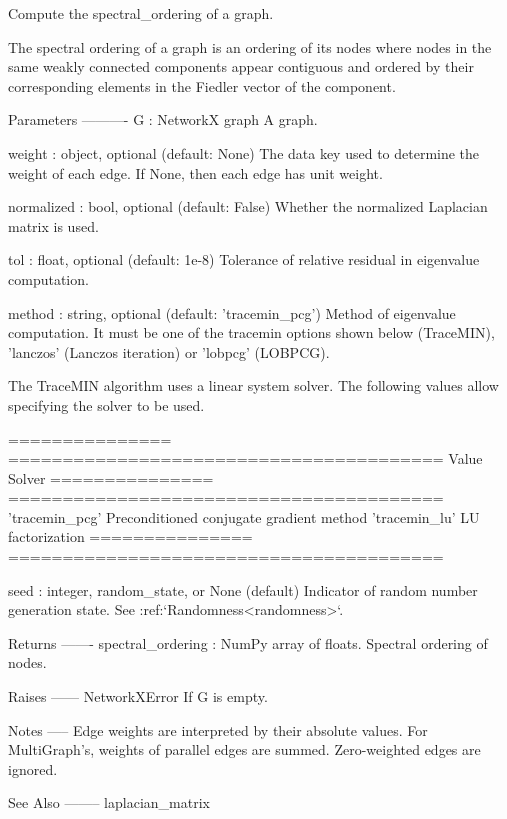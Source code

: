 \begin{DoxyVerb}Compute the spectral_ordering of a graph.

The spectral ordering of a graph is an ordering of its nodes where nodes
in the same weakly connected components appear contiguous and ordered by
their corresponding elements in the Fiedler vector of the component.

Parameters
----------
G : NetworkX graph
    A graph.

weight : object, optional (default: None)
    The data key used to determine the weight of each edge. If None, then
    each edge has unit weight.

normalized : bool, optional (default: False)
    Whether the normalized Laplacian matrix is used.

tol : float, optional (default: 1e-8)
    Tolerance of relative residual in eigenvalue computation.

method : string, optional (default: 'tracemin_pcg')
    Method of eigenvalue computation. It must be one of the tracemin
    options shown below (TraceMIN), 'lanczos' (Lanczos iteration)
    or 'lobpcg' (LOBPCG).

    The TraceMIN algorithm uses a linear system solver. The following
    values allow specifying the solver to be used.

    =============== ========================================
    Value           Solver
    =============== ========================================
    'tracemin_pcg'  Preconditioned conjugate gradient method
    'tracemin_lu'   LU factorization
    =============== ========================================

seed : integer, random_state, or None (default)
    Indicator of random number generation state.
    See :ref:`Randomness<randomness>`.

Returns
-------
spectral_ordering : NumPy array of floats.
    Spectral ordering of nodes.

Raises
------
NetworkXError
    If G is empty.

Notes
-----
Edge weights are interpreted by their absolute values. For MultiGraph's,
weights of parallel edges are summed. Zero-weighted edges are ignored.

See Also
--------
laplacian_matrix
\end{DoxyVerb}
 